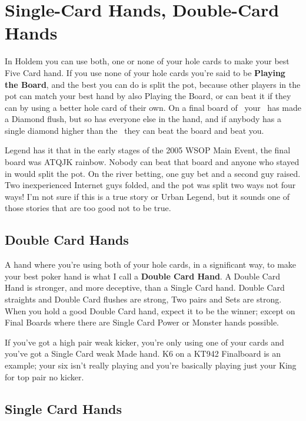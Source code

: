 \chapter{Single-Card Hands, Double-Card Hands}


In Holdem you can use both, one or none of your hole cards to make your
best Five Card hand. If you use none of your hole cards you're said to
be \textbf{Playing the Board}, and the best you can do is split the
pot, because other players in the pot can match your best hand by also
Playing the Board, or can beat it if they can by using a better hole
card of their own. On a final board of \Ad\nined\eigd\Jd\sixd\ your
\Qc\Qs\ has made a Diamond flush, but so has everyone else in the hand,
and if anybody has a single diamond higher than the \sixd\ they can
beat the board and beat you.

Legend has it that in the early stages of the 2005 WSOP Main Event,
the final board was ATQJK rainbow. Nobody can beat that board and
anyone who stayed in would split the pot. On the river betting, one
guy bet and a second guy raised. Two inexperienced Internet guys
folded, and the pot was split two ways not four ways! I'm not sure if
this is a true story or Urban Legend, but it sounds one of those
stories that are too good not to be true.

\section{Double Card Hands}

A hand where you're using both of your hole cards, in a significant
way, to make your best poker hand is what I call a \textbf{Double Card
Hand}. A Double Card Hand is stronger, and more deceptive, than a
Single Card hand. Double Card straights and Double Card flushes are
strong, Two pairs and Sets are strong. When you hold a good Double
Card hand, expect it to be the winner; except on Final Boards where
there are Single Card Power or Monster hands possible.

If you've got a high pair weak kicker, you're only using one of your
cards and you've got a Single Card weak Made hand. K6 on a KT942
Finalboard is an example; your six isn't really playing and you're
basically playing just your King for top pair no kicker.

\section{Single Card Hands}

